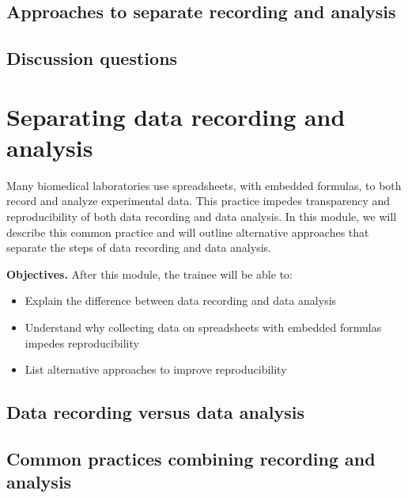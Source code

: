 \documentclass[]{tufte-book}
\providecommand{\tightlist}{%
  \setlength{\itemsep}{0pt}\setlength{\parskip}{0pt}}
\begin{document}
\hypertarget{approaches-to-separate-recording-and-analysis-12}{%
\subsection{Approaches to separate recording and analysis}\label{approaches-to-separate-recording-and-analysis-12}}

\hypertarget{discussion-questions-12}{%
\subsection{Discussion questions}\label{discussion-questions-12}}

\hypertarget{separating-data-recording-and-analysis-13}{%
\section{Separating data recording and analysis}\label{separating-data-recording-and-analysis-13}}

Many biomedical laboratories use spreadsheets, with embedded formulas, to both
record and analyze experimental data. This practice impedes transparency and
reproducibility of both data recording and data analysis. In this module, we
will describe this common practice and will outline alternative approaches that
separate the steps of data recording and data analysis.

\textbf{Objectives.} After this module, the trainee will be able to:

\begin{itemize}
\tightlist
\item
  Explain the difference between data recording and data analysis
\item
  Understand why collecting data on spreadsheets with embedded formulas impedes
  reproducibility
\item
  List alternative approaches to improve reproducibility
\end{itemize}

\hypertarget{data-recording-versus-data-analysis-13}{%
\subsection{Data recording versus data analysis}\label{data-recording-versus-data-analysis-13}}

\hypertarget{common-practices-combining-recording-and-analysis-13}{%
\subsection{Common practices combining recording and analysis}\label{common-practices-combining-recording-and-analysis-13}}
\end{document}

